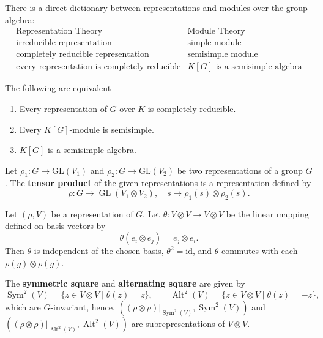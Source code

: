 \begin{remark}
There is a direct dictionary between representations and modules over the group algebra:
\[
\begin{array}{c|c}
\text{Representation Theory} & \text{Module Theory} \\
\hline
\text{irreducible representation} & \text{simple module} \\
\text{completely reducible representation} & \text{semisimple module} \\
\text{every representation is completely reducible} & K[G] \text{ is a semisimple algebra}
\end{array}
\]

The following are equivalent
\begin{enumerate}
    \item Every representation of $G$ over $K$ is completely reducible.
    \item Every $K[G]$-module is semisimple.
    \item $K[G]$ is a semisimple algebra.
\end{enumerate}


\end{remark}

\begin{defn}
Let \(\rho_1: G \to \mathrm{GL}(V_1)\) and \(\rho_2: G \to \mathrm{GL}(V_2)\) be two representations of a group \(G\). The \textbf{tensor product} of the given representations is a representation defined by
\[
\rho:G\to\operatorname{GL}(V_1 \otimes V_2),\quad s \mapsto \rho_1(s)\otimes\rho_2(s).
\]
\end{defn}
\begin{exmp}
Let \((\rho, V)\) be a representation of \(G\). Let \(\theta: V \otimes V \to V \otimes V\) be the linear mapping defined on basis vectors by
\[
\theta(e_i \otimes e_j) = e_j \otimes e_i.
\]
Then \(\theta\) is independent of the chosen basis, \(\theta^2 = \mathrm{id}\), and \(\theta\) commutes with each \(\rho(g) \otimes \rho(g)\).

The \textbf{symmetric square} and \textbf{alternating square} are given by
\[
\operatorname{Sym}^2(V) = \{ z \in V \otimes V \mid \theta(z) = z \}, \qquad
\operatorname{Alt}^2(V) = \{ z \in V \otimes V \mid \theta(z) = -z \},
\]
which are \(G\)-invariant, hence, \(((\rho\otimes\rho)|_{\operatorname{Sym}^2(V)},\operatorname{Sym}^2(V))\) and \(((\rho\otimes\rho)|_{\operatorname{Alt}^2(V)},\operatorname{Alt}^2(V))\) are subrepresentations of \(V \otimes V\).

\end{exmp}




